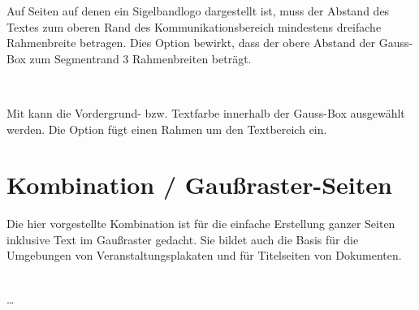 \begin{table}[!ht]
\begin{desctable}
\end{desctable}%
\caption[{Mögliche Werte für Option }]%
  {Mögliche Werte für Option  zur
    Kontrolle des Abstandes von Gauss-Boxen zum Kommunikationsbereich}
  \label{tab:gausspage:outerpadding}
\end{table}

\begin{Declaration}
\end{Declaration}

Auf Seiten auf denen ein Sigelbandlogo dargestellt ist, muss der Abstand
des Textes zum oberen Rand des Kommunikationsbereich mindestens
dreifache Rahmenbreite betragen. Dies Option  bewirkt,
dass der obere Abstand der Gauss-Box zum Segmentrand 3 Rahmenbreiten beträgt.

\begin{Declaration}
  \\
\end{Declaration}

Mit  kann die Vordergrund- bzw. Textfarbe
innerhalb der Gauss-Box ausgewählt werden.
Die Option  fügt einen Rahmen um den Textbereich
ein.%

\section{Kombination / Gaußraster-Seiten}\label{sec:gausspage:kombi}

Die hier vorgestellte Kombination ist für die einfache Erstellung ganzer Seiten
inklusive Text im Gaußraster gedacht.
Sie bildet auch die Basis für die Umgebungen von Veranstaltungsplakaten und
für Titelseiten von Dokumenten.

\begin{Declaration}
    \\
  \quad\dots\\
\end{Declaration}

